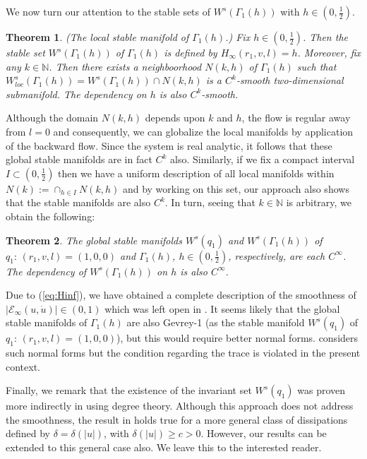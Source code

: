 \documentclass[reqno,12pt]{amsart}
\renewcommand{\eqref}[1]{(\ref{eq:#1})}
\newcommand{\thmlab}[1]{\label{theorem:#1}}
\newtheorem{theorem}{Theorem}[section]
\numberwithin{equation}{section}
\begin{document}
We now turn our attention to the stable sets of  $W^s(\Gamma_1(h))$ with $h\in (0,\frac12)$.
\begin{theorem}\thmlab{main2}
\textnormal{(The local stable manifold of $\Gamma_1(h)$.)}
Fix $h\in \left(0,\frac12\right)$. Then the stable set $W^s(\Gamma_1(h))$ of $\Gamma_1(h)$ is defined by $H_\infty(r_1,v,l)=h$. 
 Moreover, fix any $k\in \mathbb N$. Then there exists a neighboorhood $N(k,h)$ of $\Gamma_1(h)$ such that $W_{loc}^s(\Gamma_1(h))=W^s(\Gamma_1(h))\cap N(k,h)$ is a $C^k$-smooth two-dimensional submanifold. The dependency on $h$ is also $C^k$-smooth.
\end{theorem}
Although the domain $N(k,h)$ depends upon $k$ and $h$, the flow is regular away from $l=0$ and consequently, we can globalize the local manifolds by application of the backward flow. Since the system is real analytic, it follows that these global stable manifolds are in fact $C^k$ also. Similarly, if we fix a compact interval $I\subset \left(0,\frac12\right)$ then we have a uniform description of all local manifolds within $N(k):=\cap_{h\in I} N(k,h)$ and by working on this set, our approach also shows that the stable manifolds are also $C^k$. In turn, seeing that $k\in \mathbb N$ is arbitrary, we obtain the following:
\begin{theorem}\thmlab{main3}
The global stable manifolds $W^s(q_1)$ and $W^s(\Gamma_1(h))$ of $q_1:\,(r_1,v,l)=(1,0,0)$ and $\Gamma_1(h)$, $h\in \left(0,\frac12\right)$, respectively, are each $C^\infty$. The dependency of $W^s(\Gamma_1(h))$ on $h$ is also $C^\infty$. 
\end{theorem}

Due to \eqref{Hinf}, we have obtained a complete description of the smoothness of $\vert \mathcal E_\infty(u,\dot u)\vert\in(0,1)$ which was left open in \cite{margheri2017a}.  It seems likely that the global stable manifolds of $\Gamma_1(h)$ are also Gevrey-1 (as the stable manifold $W^s(q_1)$ of $q_1:\,(r_1,v,l)=(1,0,0)$), but this would require better normal forms. \cite{bittmann2018a} considers such normal forms but the condition regarding the trace is violated in the present context. 

Finally, we remark that the existence of the invariant set $W^s(q_1)$ was proven more indirectly in \cite{margheri2017a} using degree theory. Although this approach does not address the smoothness, the result in \cite{margheri2017ab} holds true for a more general class of dissipations defined by $\delta=\delta(\vert u\vert)$, with $\delta(\vert u\vert)\ge c>0$. However, our results can be extended to this general case also. We leave this to the interested reader. 
\end{document}
